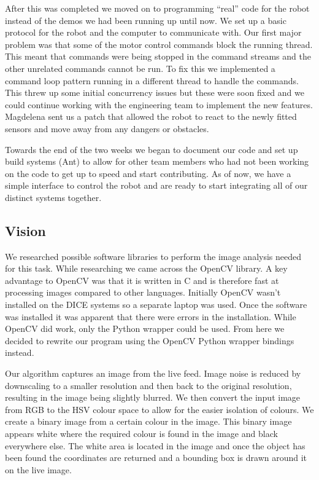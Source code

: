 \documentclass[12pt, a4paper, titlepage]{article}
\begin{document}
After this was completed we moved on to programming ``real'' code for the
robot instead of the demos we had been running up until now. We set up a basic
protocol for the robot and the computer to communicate with. Our first major
problem was that some of the motor control commands block the running thread.
This meant that commands were being stopped in the command streams and the other
unrelated commands cannot be run. To fix this we implemented a command loop
pattern running in a different thread to handle the commands. This threw up
some initial concurrency issues but these were soon fixed and we could continue
working with the engineering team to implement the new features. Magdelena sent
us a patch that allowed the robot to react to the newly fitted sensors and move
away from any dangers or obstacles.

Towards the end of the two weeks we began to document our code and set up build
systems (Ant\cite{ant}) to allow for other team members who had not been working
on the code to get up to speed and start contributing. As of now, we have a
simple interface to control the robot and are ready to start integrating all of
our distinct systems together.

\subsection{Vision}

We researched possible software libraries to perform the image analysis needed
for this task. While researching we came across the OpenCV library\cite{opencv}.
A key advantage to OpenCV was that it is written in C and is therefore fast
at processing images compared to other languages. Initially OpenCV wasn't
installed on the DICE systems so a separate laptop was used. Once the software
was installed it was apparent that there were errors in the installation. While
OpenCV did work, only the Python wrapper could be used. From here we decided to
rewrite our program using the OpenCV Python wrapper bindings instead.

Our algorithm captures an image from the live feed. Image noise is reduced by
downscaling to a smaller resolution and then back to the original resolution,
resulting in the image being slightly blurred. We then convert the input image
from RGB to the HSV colour space to allow for the easier isolation of colours.
We create a binary image from a certain colour in the image. This binary
image appears white where the required colour is found in the image and black
everywhere else. The white area is located in the image and once the object has
been found the coordinates are returned and a bounding box is drawn around it on
the live image.
\end{document}
